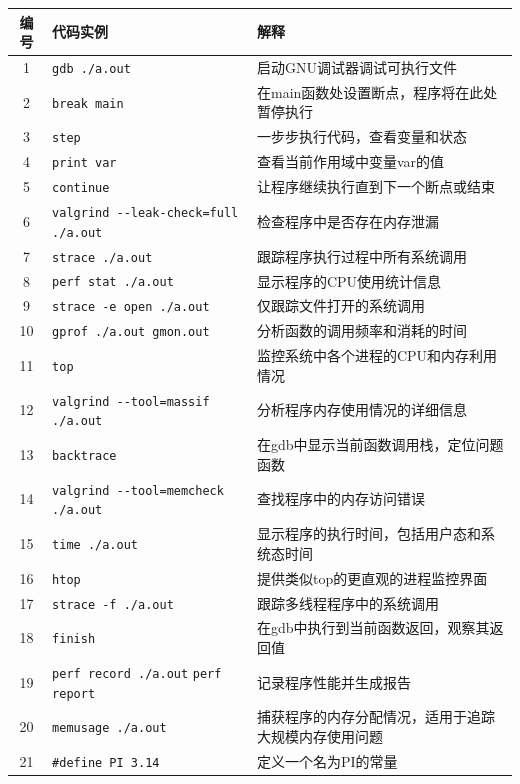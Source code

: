 \documentclass{article}
\begin{document}
\noindent
\begin{longtable}{|c|p{10cm}|l|}
\hline
\textbf{编号} & \textbf{代码实例} & \textbf{解释} \\
\hline
1 & \verb|gdb ./a.out| & 启动GNU调试器调试可执行文件 \\
\hline
2 & \verb|break main| & 在main函数处设置断点，程序将在此处暂停执行 \\
\hline
3 & \verb|step| & 一步步执行代码，查看变量和状态 \\
\hline
4 & \verb|print var| & 查看当前作用域中变量var的值 \\
\hline
5 & \verb|continue| & 让程序继续执行直到下一个断点或结束 \\
\hline
6 & \verb|valgrind --leak-check=full ./a.out| & 检查程序中是否存在内存泄漏 \\
\hline
7 & \verb|strace ./a.out| & 跟踪程序执行过程中所有系统调用 \\
\hline
8 & \verb|perf stat ./a.out| & 显示程序的CPU使用统计信息 \\
\hline
9 & \verb|strace -e open ./a.out| & 仅跟踪文件打开的系统调用 \\
\hline
10 & \verb|gprof ./a.out gmon.out| & 分析函数的调用频率和消耗的时间 \\
\hline
11 & \verb|top| & 监控系统中各个进程的CPU和内存利用情况 \\
\hline
12 & \verb|valgrind --tool=massif ./a.out| & 分析程序内存使用情况的详细信息 \\
\hline
13 & \verb|backtrace| & 在gdb中显示当前函数调用栈，定位问题函数 \\
\hline
14 & \verb|valgrind --tool=memcheck ./a.out| & 查找程序中的内存访问错误 \\
\hline
15 & \verb|time ./a.out| & 显示程序的执行时间，包括用户态和系统态时间 \\
\hline
16 & \verb|htop| & 提供类似top的更直观的进程监控界面 \\
\hline
17 & \verb|strace -f ./a.out| & 跟踪多线程程序中的系统调用 \\
\hline
18 & \verb|finish| & 在gdb中执行到当前函数返回，观察其返回值 \\
\hline
19 & \verb|perf record ./a.out| \newline \verb|perf report| & 记录程序性能并生成报告 \\
\hline
20 & \verb|memusage ./a.out| & 捕获程序的内存分配情况，适用于追踪大规模内存使用问题 \\
\hline
21 & \verb|#define PI 3.14| & 定义一个名为PI的常量 \\

\end{longtable}
\end{document}
